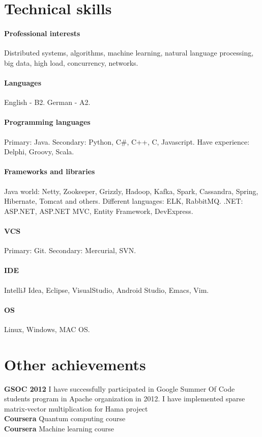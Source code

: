 \documentclass{article}
\begin{document}
\section*{Technical skills}

\paragraph{Professional interests} Distributed systems, algorithms, machine learning, natural language processing, big data, high load, concurrency, networks.
\paragraph{Languages} English - B2. German - A2.
\paragraph{Programming languages} Primary: Java. Secondary: Python, C\#, C++, C, Javascript. Have experience: Delphi, Groovy, Scala.
\paragraph{Frameworks and libraries} Java world: Netty, Zookeeper, Grizzly, Hadoop, Kafka, Spark, Cassandra, Spring, Hibernate, Tomcat and others. Different languages: ELK, RabbitMQ. .NET: ASP.NET, ASP.NET MVC, Entity Framework, DevExpress.
\paragraph{VCS} Primary: Git. Secondary: Mercurial, SVN.
\paragraph{IDE} IntelliJ Idea, Eclipse, VisualStudio, Android Studio, Emacs, Vim.
\paragraph{OS} Linux, Windows, MAC OS.

\section*{Other achievements}
\textbf{GSOC 2012} I have successfully participated in Google Summer Of Code students program in Apache organization in 2012. I have implemented sparse matrix-vector multiplication for Hama project\\
\textbf{Coursera} Quantum computing course\\
\textbf{Coursera} Machine learning course
\end{document}
